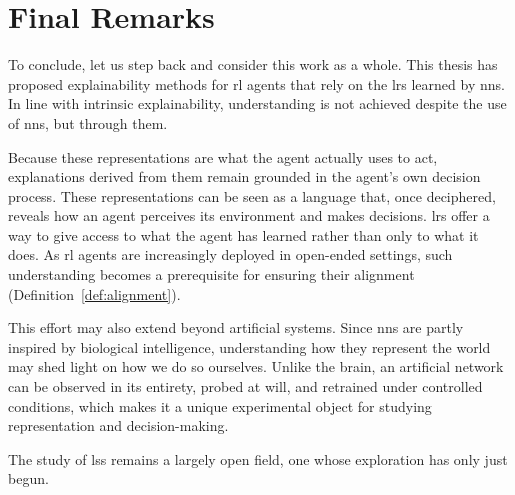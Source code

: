 \section{Final Remarks}
\label{sec:conclusion_final_remarks}

To conclude, let us step back and consider this work as a whole.
This thesis has proposed explainability methods for \gls{rl} agents that rely on the \glspl{lr} learned by \glspl{nn}.
In line with intrinsic explainability, understanding is not achieved despite the use of \glspl{nn}, but through them.

Because these representations are what the agent actually uses to act, explanations derived from them remain grounded in the agent's own decision process.
These representations can be seen as a language that, once deciphered, reveals how an agent perceives its environment and makes decisions.
\Glspl{lr} offer a way to give access to what the agent has learned rather than only to what it does.
As \gls{rl} agents are increasingly deployed in open-ended settings, such understanding becomes a prerequisite for ensuring their alignment (Definition~\ref{def:alignment}).

This effort may also extend beyond artificial systems.
Since \glspl{nn} are partly inspired by biological intelligence, understanding how they represent the world may shed light on how we do so ourselves.
Unlike the brain, an artificial network can be observed in its entirety, probed at will, and retrained under controlled conditions, which makes it a unique experimental object for studying representation and decision-making.

The study of \glspl{ls} remains a largely open field, one whose exploration has only just begun.